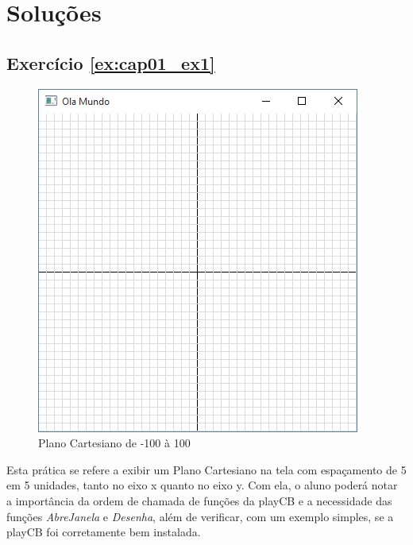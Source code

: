 \section{Soluções}

\subsection*{Exercício \ref{ex:cap01_ex1}}
\begin{figure}[ht]
  \centerline{\includegraphics[width=.5\textwidth]{img/cap1_ex1.png}}
  \caption{Plano Cartesiano de -100 à 100}
  \label{fig:cap01_ex1}
\end{figure}

Esta prática se refere a exibir um Plano Cartesiano na tela com espaçamento de 5 em 5 unidades, tanto no eixo x quanto no eixo y. Com ela, o aluno poderá notar a importância da ordem de chamada de funções da playCB e a necessidade das funções \emph{AbreJanela} e \emph{Desenha}, além de verificar, com um exemplo simples, se a playCB foi corretamente bem instalada.



